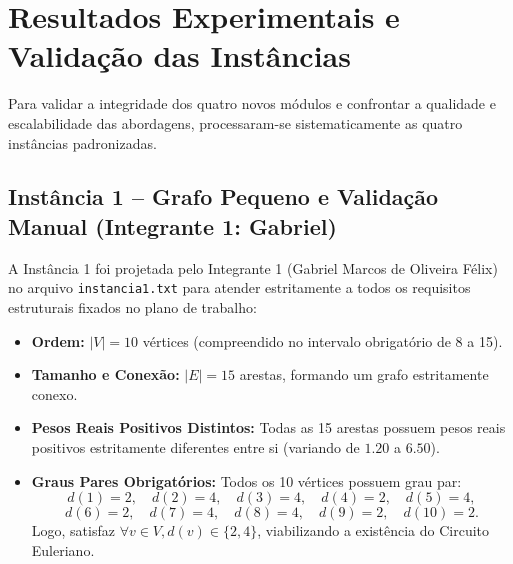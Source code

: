 \documentclass[12pt,a4paper]{article}
\begin{document}
\section{Resultados Experimentais e Validação das Instâncias}

Para validar a integridade dos quatro novos módulos e confrontar a qualidade e escalabilidade das abordagens, processaram-se sistematicamente as quatro instâncias padronizadas.

\subsection{Instância 1 -- Grafo Pequeno e Validação Manual (Integrante 1: Gabriel)}
A Instância 1 foi projetada pelo Integrante 1 (Gabriel Marcos de Oliveira Félix) no arquivo \texttt{instancia1.txt} para atender estritamente a todos os requisitos estruturais fixados no plano de trabalho:
\begin{itemize}
    \item \textbf{Ordem:} $|V| = 10$ vértices (compreendido no intervalo obrigatório de 8 a 15).
    \item \textbf{Tamanho e Conexão:} $|E| = 15$ arestas, formando um grafo estritamente conexo.
    \item \textbf{Pesos Reais Positivos Distintos:} Todas as 15 arestas possuem pesos reais positivos estritamente diferentes entre si (variando de $1.20$ a $6.50$).
    \item \textbf{Graus Pares Obrigatórios:} Todos os 10 vértices possuem grau par:
    \begin{equation}
        d(1)=2, \quad d(2)=4, \quad d(3)=4, \quad d(4)=2, \quad d(5)=4,
    \end{equation}
    \begin{equation}
        d(6)=2, \quad d(7)=4, \quad d(8)=4, \quad d(9)=2, \quad d(10)=2.
    \end{equation}
    Logo, satisfaz $\forall v \in V, d(v) \in \{2, 4\}$, viabilizando a existência do Circuito Euleriano.
\end{itemize}
\end{document}
